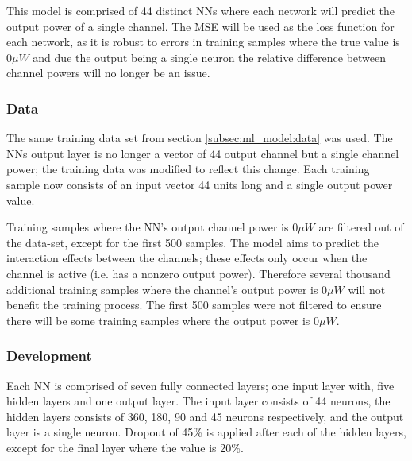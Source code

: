 This model is comprised of 44 distinct NNs where each network will predict the output power of a single channel. The MSE will be used as the loss function for each network, as it is robust to errors in training samples where the true value is $0\mu W$ and due the output being a single neuron the relative difference between channel powers will no longer be an issue.


\subsubsection{Data}
The same training data set from section \ref{subsec:ml_model:data} was used. The NNs output layer is no longer a vector of 44 output channel but a single channel power; the training data was modified to reflect this change. Each training sample now consists of an input vector 44 units long and a single output power value. 

Training samples where the NN's output channel power is $0\mu W$ are filtered out of the data-set, except for the first 500 samples. The model aims to predict the interaction effects between the channels; these effects only occur when the channel is active (i.e. has a nonzero output power). Therefore several thousand additional training samples where the channel's output power is $0\mu W$ will not benefit the training process. The first 500 samples were not filtered to ensure there will be some training samples where the output power is $0\mu W$.



\subsubsection{Development}

Each NN is comprised of seven fully connected layers; one input layer with, five hidden layers and one output layer. The input layer consists of 44 neurons, the hidden layers consists of 360, 180, 90 and 45 neurons respectively, and the output layer is a single neuron. Dropout of 45\% is applied after each of the hidden layers, except for the final layer where the value is 20\%.


